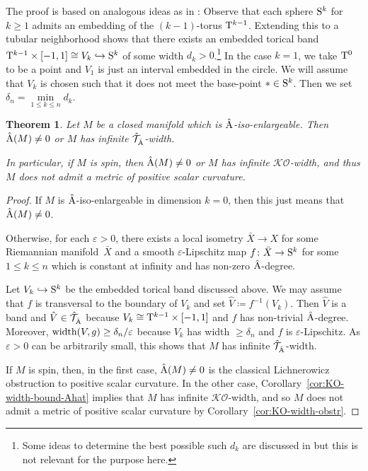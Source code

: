 \documentclass[pdftex]{sigma}
\numberwithin{equation}{section}
\newtheorem{Theorem}{Theorem}[section]
\begin{document}
The proof is based on analogous ideas as in \cite[Section~3]{Gromov:MetricInequalitiesScalar}:
Observe that each sphere \(\mathrm{S}^{k}\) for \(k \geq 1\) admits an embedding of the \((k-1)\)-torus \(\mathrm{T}^{k-1}\).
Extending this to a tubular neighborhood shows that there exists an embedded torical band \(\mathrm{T}^{k-1} \times [-1,1] \cong V_k \hookrightarrow \mathrm{S}^{k}\) of some width \(d_k > 0\).\footnote{Some ideas to determine the best possible such \(d_k\) are discussed in \cite[Section~3]{Gromov:MetricInequalitiesScalar} but this is not relevant for the purpose here.}
In the case \(k = 1\), we take \(\mathrm{T}^{0}\) to be a point and \(V_1\) is just an interval embedded in the circle.
We will assume that \(V_k\) is chosen such that it does not meet the base-point \(\ast \in \mathrm{S}^k\).
Then we set \(\delta_n = \min\limits_{1 \leq k \leq n} d_k\).
\begin{Theorem}\label{thm:A-hat-iso-enlargeable-technical}
 Let \(M\) be a closed manifold which is \(\hat{\mathrm{A}}\)-iso-enlargeable.
 Then \(\hat{\mathrm{A}}(M) \neq 0\) or \(M\) has infinite \(\hat{\mathcal{T}}_{\hat{\mathrm{A}}}\)-width.

 In particular, if \(M\) is spin, then \(\hat{\mathrm{A}}(M) \neq 0\) or \(M\) has infinite \(\mathcal{KO}\)-width, and thus \(M\) does not admit a metric of positive scalar curvature.
\end{Theorem}
\begin{proof}
 If \(M\) is \(\hat{\mathrm{A}}\)-iso-enlargeable in dimension \(k = 0\), then this just means that \(\hat{\mathrm{A}}(M) \neq 0\).

 Otherwise, for each \(\varepsilon > 0\), there exists a local isometry \(\bar{X} \to X\) for some Riemannian mani\-fold~\(\bar{X}\) and a smooth \(\varepsilon\)-Lipschitz map \(f \colon \bar{X} \to \mathrm{S}^k\) for some \(1 \leq k \leq n\) which is constant at infinity and has non-zero \(\hat{\mathrm{A}}\)-degree.

 Let \(V_k \hookrightarrow \mathrm{S}^k\) be the embedded torical band discussed above.
 We may assume that \(f\) is transversal to the boundary of \(V_k\) and set \(\hat{V} \coloneqq f^{-1}(V_k)\).
 Then \(\hat{V}\) is a band and \(\hat{V} \in \hat{\mathcal{T}}_{\hat{\mathrm{A}}}\) because \(V_k \cong \mathrm{T}^{k-1} \times [-1,1]\) and \(f\) has non-trivial \(\hat{\mathrm{A}}\)-degree.
 Moreover, \(\operatorname{width}(V, g) \geq \delta_n / \varepsilon\) because \(V_k\) has width \(\geq \delta_n\) and \(f\) is \(\varepsilon\)-Lipschitz.
 As \(\varepsilon > 0\) can be arbitrarily small, this shows that \(M\) has infinite \(\hat{\mathcal{T}}_{\hat{\mathrm{A}}}\)-width.

 If \(M\) is spin, then, in the first case, \(\hat{\mathrm{A}}(M) \neq 0\) is the classical Lichnerowicz obstruction to positive scalar curvature.
 In the other case, Corollary~\ref{cor:KO-width-bound-Ahat} implies that \(M\) has infinite \(\mathcal{KO}\)-width, and so \(M\) does not admit a metric of positive scalar curvature by Corollary~\ref{cor:KO-width-obstr}.
\end{proof}
\end{document}

